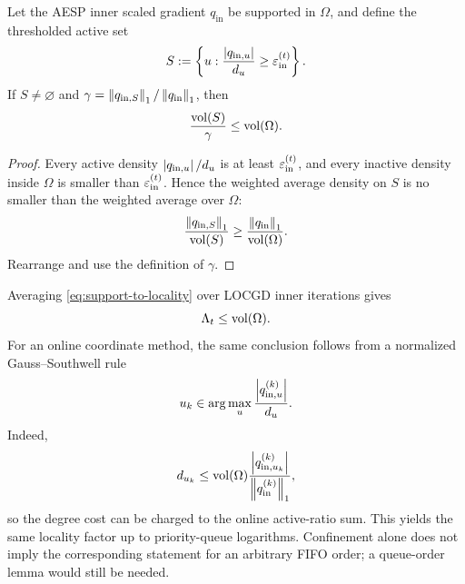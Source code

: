 \begin{lemma}
\label{lem:support-to-locality}
Let the AESP inner scaled gradient \(q_{\mathrm{in}}\) be supported in
\(\Omega\), and define the thresholded active set
\begin{equation}
    S:=\left\{u:\frac{\left\lvert q_{\mathrm{in},u}\right\rvert}{d_u}
                   \geq\varepsilon_{\mathrm{in}}^{(t)}\right\}.
    \label{eq:thresholded-set-generic}
\end{equation}
If \(S\neq\varnothing\) and
\(
\gamma=\left\lVert q_{\mathrm{in},S}\right\rVert_1/\left\lVert q_{\mathrm{in}}\right\rVert_1
\), then
\begin{equation}
    \frac{\operatorname{vol}(S)}{\gamma}
    \leq\operatorname{vol}(\Omega).
    \label{eq:support-to-locality}
\end{equation}
\end{lemma}

\begin{proof}
Every active density \(\left\lvert q_{\mathrm{in},u}\right\rvert/d_u\) is at least
\(\varepsilon_{\mathrm{in}}^{(t)}\), and every inactive density inside
\(\Omega\) is smaller than \(\varepsilon_{\mathrm{in}}^{(t)}\).  Hence the
weighted average density on \(S\) is no smaller than the weighted average over
\(\Omega\):
\[
    \frac{\left\lVert q_{\mathrm{in},S}\right\rVert_1}{\operatorname{vol}(S)}
    \geq
    \frac{\left\lVert q_{\mathrm{in}}\right\rVert_1}{\operatorname{vol}(\Omega)}.
\]
Rearrange and use the definition of \(\gamma\).
\end{proof}

Averaging \cref{eq:support-to-locality} over LOCGD inner iterations gives
\begin{equation}
    \Lambda_t\leq\operatorname{vol}(\Omega).
    \label{eq:locgd-envelope-locality}
\end{equation}
For an online coordinate method, the same conclusion follows from a
normalized Gauss--Southwell rule
\begin{equation}
    u_k\in\arg\max_u\frac{\left\lvert q_{\mathrm{in},u}^{(k)}\right\rvert}{d_u}.
    \label{eq:priority-rule}
\end{equation}
Indeed,
\begin{equation}
    d_{u_k}
    \leq
    \operatorname{vol}(\Omega)
    \frac{\left\lvert q_{\mathrm{in},u_k}^{(k)}\right\rvert}
         {\left\lVert q_{\mathrm{in}}^{(k)}\right\rVert_1},
    \label{eq:priority-cost-charge}
\end{equation}
so the degree cost can be charged to the online active-ratio sum.  This yields
the same locality factor up to priority-queue logarithms.  Confinement alone
does not imply the corresponding statement for an arbitrary FIFO order; a
queue-order lemma would still be needed.

